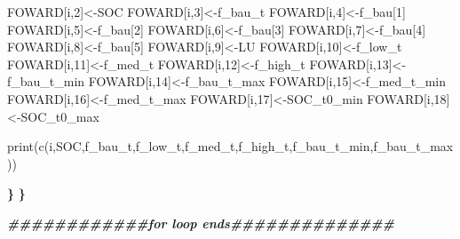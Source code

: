 \documentclass[
  10pt,
  b5paper,
]{book}
\newenvironment{Shaded}{\begin{snugshade}}{\end{snugshade}}
\newcommand{\DecValTok}[1]{\textcolor[rgb]{0.00,0.00,0.81}{#1}}
\newcommand{\DocumentationTok}[1]{\textcolor[rgb]{0.56,0.35,0.01}{\textbf{\textit{#1}}}}
\newcommand{\ErrorTok}[1]{\textcolor[rgb]{0.64,0.00,0.00}{\textbf{#1}}}
\newcommand{\FunctionTok}[1]{\textcolor[rgb]{0.00,0.00,0.00}{#1}}
\newcommand{\NormalTok}[1]{#1}
\newcommand{\OtherTok}[1]{\textcolor[rgb]{0.56,0.35,0.01}{#1}}
\begin{document}
\begin{Shaded}
\begin{Highlighting}[]
\NormalTok{FOWARD[i,}\DecValTok{2}\NormalTok{]}\OtherTok{\textless{}{-}}\NormalTok{SOC}
\NormalTok{FOWARD[i,}\DecValTok{3}\NormalTok{]}\OtherTok{\textless{}{-}}\NormalTok{f\_bau\_t}
\NormalTok{FOWARD[i,}\DecValTok{4}\NormalTok{]}\OtherTok{\textless{}{-}}\NormalTok{f\_bau[}\DecValTok{1}\NormalTok{]}
\NormalTok{FOWARD[i,}\DecValTok{5}\NormalTok{]}\OtherTok{\textless{}{-}}\NormalTok{f\_bau[}\DecValTok{2}\NormalTok{]}
\NormalTok{FOWARD[i,}\DecValTok{6}\NormalTok{]}\OtherTok{\textless{}{-}}\NormalTok{f\_bau[}\DecValTok{3}\NormalTok{]}
\NormalTok{FOWARD[i,}\DecValTok{7}\NormalTok{]}\OtherTok{\textless{}{-}}\NormalTok{f\_bau[}\DecValTok{4}\NormalTok{]}
\NormalTok{FOWARD[i,}\DecValTok{8}\NormalTok{]}\OtherTok{\textless{}{-}}\NormalTok{f\_bau[}\DecValTok{5}\NormalTok{]}
\NormalTok{FOWARD[i,}\DecValTok{9}\NormalTok{]}\OtherTok{\textless{}{-}}\NormalTok{LU}
\NormalTok{FOWARD[i,}\DecValTok{10}\NormalTok{]}\OtherTok{\textless{}{-}}\NormalTok{f\_low\_t}
\NormalTok{FOWARD[i,}\DecValTok{11}\NormalTok{]}\OtherTok{\textless{}{-}}\NormalTok{f\_med\_t}
\NormalTok{FOWARD[i,}\DecValTok{12}\NormalTok{]}\OtherTok{\textless{}{-}}\NormalTok{f\_high\_t}
\NormalTok{FOWARD[i,}\DecValTok{13}\NormalTok{]}\OtherTok{\textless{}{-}}\NormalTok{f\_bau\_t\_min}
\NormalTok{FOWARD[i,}\DecValTok{14}\NormalTok{]}\OtherTok{\textless{}{-}}\NormalTok{f\_bau\_t\_max}
\NormalTok{FOWARD[i,}\DecValTok{15}\NormalTok{]}\OtherTok{\textless{}{-}}\NormalTok{f\_med\_t\_min}
\NormalTok{FOWARD[i,}\DecValTok{16}\NormalTok{]}\OtherTok{\textless{}{-}}\NormalTok{f\_med\_t\_max}
\NormalTok{FOWARD[i,}\DecValTok{17}\NormalTok{]}\OtherTok{\textless{}{-}}\NormalTok{SOC\_t0\_min}
\NormalTok{FOWARD[i,}\DecValTok{18}\NormalTok{]}\OtherTok{\textless{}{-}}\NormalTok{SOC\_t0\_max}



\FunctionTok{print}\NormalTok{(}\FunctionTok{c}\NormalTok{(i,SOC,f\_bau\_t,f\_low\_t,f\_med\_t,f\_high\_t,f\_bau\_t\_min,f\_bau\_t\_max))}

\ErrorTok{\}}
\ErrorTok{\}}

\DocumentationTok{\#\#\#\#\#\#\#\#\#\#\#\#for loop ends\#\#\#\#\#\#\#\#\#\#\#\#\#\#}
\end{Highlighting}
\end{Shaded}
\end{document}
